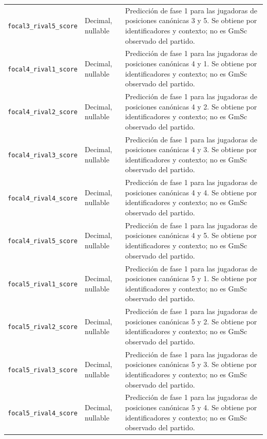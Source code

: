 \begin{longtable}{@{}>{\raggedright\arraybackslash}p{5.0cm}>{\raggedright\arraybackslash}p{1.9cm}>{\raggedright\arraybackslash}p{7.7cm}@{}}
\texttt{focal3\_\allowbreak rival5\_\allowbreak score} & Decimal, nullable & Predicción de fase 1 para las jugadoras de posiciones canónicas 3 y 5. Se obtiene por identificadores y contexto; no es GmSc observado del partido.\\
\texttt{focal4\_\allowbreak rival1\_\allowbreak score} & Decimal, nullable & Predicción de fase 1 para las jugadoras de posiciones canónicas 4 y 1. Se obtiene por identificadores y contexto; no es GmSc observado del partido.\\
\texttt{focal4\_\allowbreak rival2\_\allowbreak score} & Decimal, nullable & Predicción de fase 1 para las jugadoras de posiciones canónicas 4 y 2. Se obtiene por identificadores y contexto; no es GmSc observado del partido.\\
\texttt{focal4\_\allowbreak rival3\_\allowbreak score} & Decimal, nullable & Predicción de fase 1 para las jugadoras de posiciones canónicas 4 y 3. Se obtiene por identificadores y contexto; no es GmSc observado del partido.\\
\texttt{focal4\_\allowbreak rival4\_\allowbreak score} & Decimal, nullable & Predicción de fase 1 para las jugadoras de posiciones canónicas 4 y 4. Se obtiene por identificadores y contexto; no es GmSc observado del partido.\\
\texttt{focal4\_\allowbreak rival5\_\allowbreak score} & Decimal, nullable & Predicción de fase 1 para las jugadoras de posiciones canónicas 4 y 5. Se obtiene por identificadores y contexto; no es GmSc observado del partido.\\
\texttt{focal5\_\allowbreak rival1\_\allowbreak score} & Decimal, nullable & Predicción de fase 1 para las jugadoras de posiciones canónicas 5 y 1. Se obtiene por identificadores y contexto; no es GmSc observado del partido.\\
\texttt{focal5\_\allowbreak rival2\_\allowbreak score} & Decimal, nullable & Predicción de fase 1 para las jugadoras de posiciones canónicas 5 y 2. Se obtiene por identificadores y contexto; no es GmSc observado del partido.\\
\texttt{focal5\_\allowbreak rival3\_\allowbreak score} & Decimal, nullable & Predicción de fase 1 para las jugadoras de posiciones canónicas 5 y 3. Se obtiene por identificadores y contexto; no es GmSc observado del partido.\\
\texttt{focal5\_\allowbreak rival4\_\allowbreak score} & Decimal, nullable & Predicción de fase 1 para las jugadoras de posiciones canónicas 5 y 4. Se obtiene por identificadores y contexto; no es GmSc observado del partido.\\

\end{longtable}
